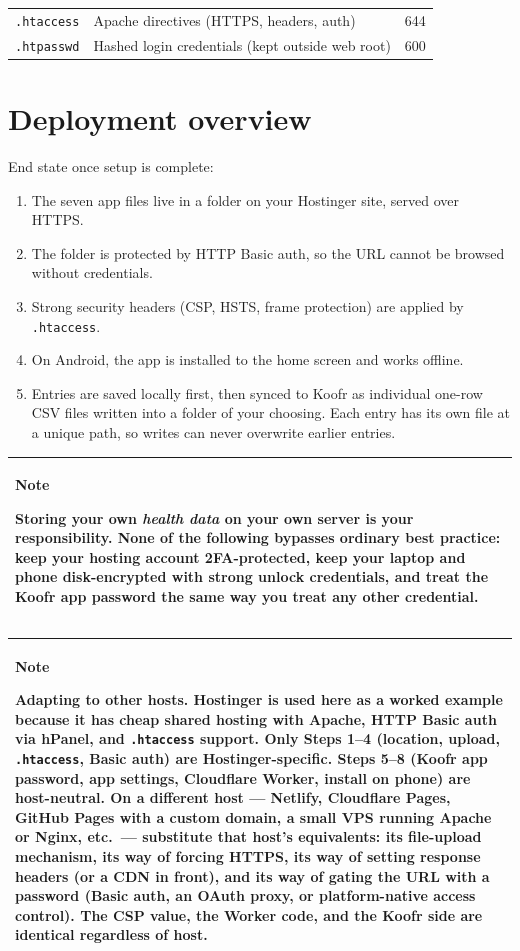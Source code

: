 \documentclass[11pt,a4paper]{article}
\newcommand{\callout}[3]{%
  \begin{center}%
  \begin{tabularx}{\linewidth}{|>{\columncolor{#1}}X|}%
  \hline
  \textbf{#2}\par\smallskip #3\\[2pt]
  \hline
  \end{tabularx}%
  \end{center}%
}
\newcommand{\notebox}[1]{\callout{notebg}{Note}{#1}}
\begin{document}
\begin{center}
\small
\begin{tabular}{lll}
\texttt{.htaccess}  & Apache directives (HTTPS, headers, auth)  & 644 \\
\texttt{.htpasswd}  & Hashed login credentials (kept outside web root) & 600 \\
\end{tabular}
\end{center}

\section{Deployment overview}

End state once setup is complete:

\begin{enumerate}[leftmargin=*,nosep]
  \item The seven app files live in a folder on your Hostinger site, served over HTTPS.
  \item The folder is protected by HTTP Basic auth, so the URL cannot be browsed without credentials.
  \item Strong security headers (CSP, HSTS, frame protection) are applied by \texttt{.htaccess}.
  \item On Android, the app is installed to the home screen and works offline.
  \item Entries are saved locally first, then synced to Koofr as individual one-row CSV files written into a folder of your choosing. Each entry has its own file at a unique path, so writes can never overwrite earlier entries.
\end{enumerate}

\notebox{Storing your own \emph{health data} on your own server is your responsibility. None of the following bypasses ordinary best practice: keep your hosting account 2FA-protected, keep your laptop and phone disk-encrypted with strong unlock credentials, and treat the Koofr app password the same way you treat any other credential.}

\notebox{\textbf{Adapting to other hosts.} Hostinger is used here as a worked example because it has cheap shared hosting with Apache, HTTP Basic auth via hPanel, and \texttt{.htaccess} support. Only Steps 1--4 (location, upload, \texttt{.htaccess}, Basic auth) are Hostinger-specific. Steps 5--8 (Koofr app password, app settings, Cloudflare Worker, install on phone) are host-neutral. On a different host --- Netlify, Cloudflare Pages, GitHub Pages with a custom domain, a small VPS running Apache or Nginx, etc.\ --- substitute that host's equivalents: its file-upload mechanism, its way of forcing HTTPS, its way of setting response headers (or a CDN in front), and its way of gating the URL with a password (Basic auth, an OAuth proxy, or platform-native access control). The CSP value, the Worker code, and the Koofr side are identical regardless of host.}
\end{document}
